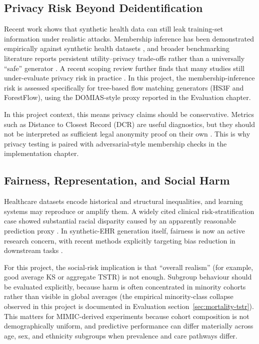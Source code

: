 \subsection{Privacy Risk Beyond Deidentification}

Recent work shows that synthetic health data can still leak training-set information under realistic attacks. Membership inference has been demonstrated empirically against synthetic health datasets \cite{zhang2022membership}, and broader benchmarking literature reports persistent utility--privacy trade-offs rather than a universally ``safe'' generator \cite{yan2022benchmarking}. A recent scoping review further finds that many studies still under-evaluate privacy risk in practice \cite{kaabachi2025scoping}. In this project, the membership-inference risk is assessed specifically for tree-based flow matching generators (HS3F and ForestFlow), using the DOMIAS-style proxy reported in the Evaluation chapter.

In this project context, this means privacy claims should be conservative. Metrics such as Distance to Closest Record (DCR) are useful diagnostics, but they should not be interpreted as sufficient legal anonymity proof on their own \cite{yao2025dcrdelusion}. This is why privacy testing is paired with adversarial-style membership checks in the implementation chapter.

\subsection{Fairness, Representation, and Social Harm}

Healthcare datasets encode historical and structural inequalities, and learning systems may reproduce or amplify them. A widely cited clinical risk-stratification case showed substantial racial disparity caused by an apparently reasonable prediction proxy \cite{obermeyer2019racialbias}. In synthetic-EHR generation itself, fairness is now an active research concern, with recent methods explicitly targeting bias reduction in downstream tasks \cite{ramachandranpillai2024btgan}.

For this project, the social-risk implication is that ``overall realism'' (for example, good average KS or aggregate TSTR) is not enough. Subgroup behaviour should be evaluated explicitly, because harm is often concentrated in minority cohorts rather than visible in global averages (the empirical minority-class collapse observed in this project is documented in Evaluation section~\ref{sec:mortality-tstr}). This matters for MIMIC-derived experiments because cohort composition is not demographically uniform, and predictive performance can differ materially across age, sex, and ethnicity subgroups when prevalence and care pathways differ.

